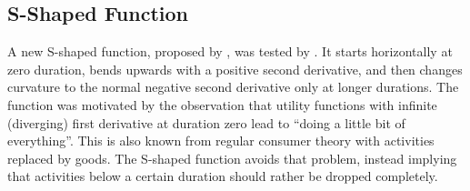  




\subsection{S-Shaped Function}
\label{sec:s-shaped}
A new S-shaped function, proposed by \citet[][]{Joh_PhDThesis_2004}, was tested by \citet[][p.129ff]{Feil_PhDThesis_2010}. 
It starts horizontally at zero duration, bends upwards with a positive second derivative, and then changes curvature to the normal negative second derivative only at longer durations.  
%
The function was motivated by the observation that utility functions with infinite (\ie diverging) first derivative at duration zero lead to ``doing a little bit of everything''.  This is also known from regular consumer theory with activities replaced by goods.  The S-shaped function avoids that problem, instead implying that activities below a certain duration should rather be dropped completely.
%

